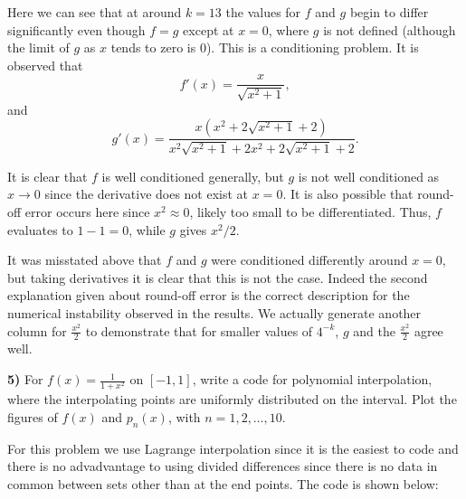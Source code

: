 \documentclass[12pt,a4paper]{article}
\newcommand{\prob}[2]{\textbf{#1)} #2}
\begin{document}
\begin{table}[H]
    \begin{center}
         
    \end{center}
\end{table}


Here we can see that at around $k = 13$ the values for $f$ and $g$ begin to differ significantly even though $f = g$ except at $x = 0$, where $g$ is not defined (although the limit of $g$ as $x$ tends to zero is 0).
This is a conditioning problem. 
It is observed that 
\[
f'\left( x \right) = \frac{x}{\sqrt{x^{2} + 1}}
,\]
and
\[
g'\left( x \right) = \frac{x \left(x^{2} + 2 \sqrt{x^{2} + 1} + 2\right)}{x^{2} \sqrt{x^{2} + 1} + 2 x^{2} + 2 \sqrt{x^{2} + 1} + 2}
.\]

It is clear that $f$ is well conditioned generally, but $g$ is not well conditioned as $x \rightarrow 0$ since the derivative does not exist at $x=0$.
It is also possible that round-off error occurs here since $x^2 \approx 0$, likely too small to be differentiated.
Thus, $f$ evaluates to $1 - 1 = 0$, while $g$ gives $x^2/2$.

{\color{red} It was misstated above that $f$ and $g$ were conditioned differently around $x=0$, but taking derivatives it is clear that this is not the case.
Indeed the second explanation given about round-off error is the correct description for the numerical instability observed in the results.
We actually generate another column for $\frac{x^2}{2}$ to demonstrate that for smaller values of $4^{-k}$, $g$ and the $\frac{x^2}{2}$ agree well.

\begin{table}[H]
    \begin{center}
        {\color{red} }
    \end{center}
\end{table}

}

\prob{5}{For $f\left( x \right) = \frac{1}{1+x^2}$ on $[-1,1]$, write a code for polynomial interpolation, where the interpolating points are uniformly distributed on the interval. Plot the figures of $f(x)$ and $p_{n}(x)$, with $n = 1,2,\ldots,10$.}

For this problem we use Lagrange interpolation since it is the easiest to code and there is no advadvantage to using divided differences since there is no data in common between sets other than at the end points.
The code is shown below:
\end{document}
